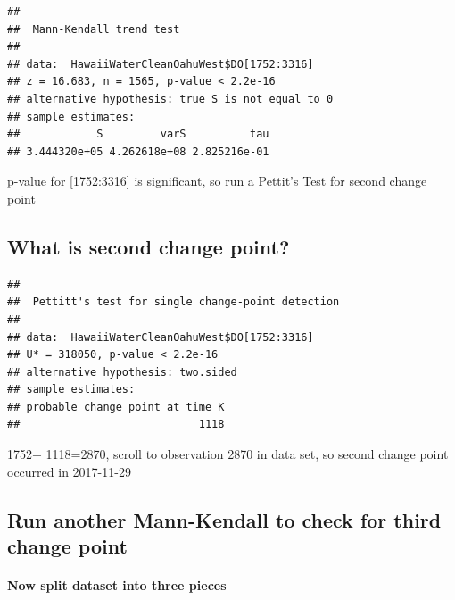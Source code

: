 \documentclass[12pt,]{article}
\newenvironment{Shaded}{\begin{snugshade}}{\end{snugshade}}
\newcommand{\KeywordTok}[1]{\textcolor[rgb]{0.13,0.29,0.53}{\textbf{#1}}}
\newcommand{\DecValTok}[1]{\textcolor[rgb]{0.00,0.00,0.81}{#1}}
\newcommand{\OperatorTok}[1]{\textcolor[rgb]{0.81,0.36,0.00}{\textbf{#1}}}
\newcommand{\NormalTok}[1]{#1}
\let\oldparagraph\paragraph
\renewcommand{\paragraph}[1]{\oldparagraph{#1}\mbox{}}
\begin{document}
\begin{verbatim}
## 
##  Mann-Kendall trend test
## 
## data:  HawaiiWaterCleanOahuWest$DO[1752:3316]
## z = 16.683, n = 1565, p-value < 2.2e-16
## alternative hypothesis: true S is not equal to 0
## sample estimates:
##            S         varS          tau 
## 3.444320e+05 4.262618e+08 2.825216e-01
\end{verbatim}

p-value for {[}1752:3316{]} is significant, so run a Pettit's Test for
second change point

\subsection{What is second change
point?}\label{what-is-second-change-point-1}

\begin{Shaded}
\end{Shaded}

\begin{verbatim}
## 
##  Pettitt's test for single change-point detection
## 
## data:  HawaiiWaterCleanOahuWest$DO[1752:3316]
## U* = 318050, p-value < 2.2e-16
## alternative hypothesis: two.sided
## sample estimates:
## probable change point at time K 
##                            1118
\end{verbatim}

1752+ 1118=2870, scroll to observation 2870 in data set, so second
change point occurred in 2017-11-29

\subsection{Run another Mann-Kendall to check for third change
point}\label{run-another-mann-kendall-to-check-for-third-change-point}

\paragraph{Now split dataset into three
pieces}\label{now-split-dataset-into-three-pieces-2}

\begin{Shaded}
\end{Shaded}
\end{document}
